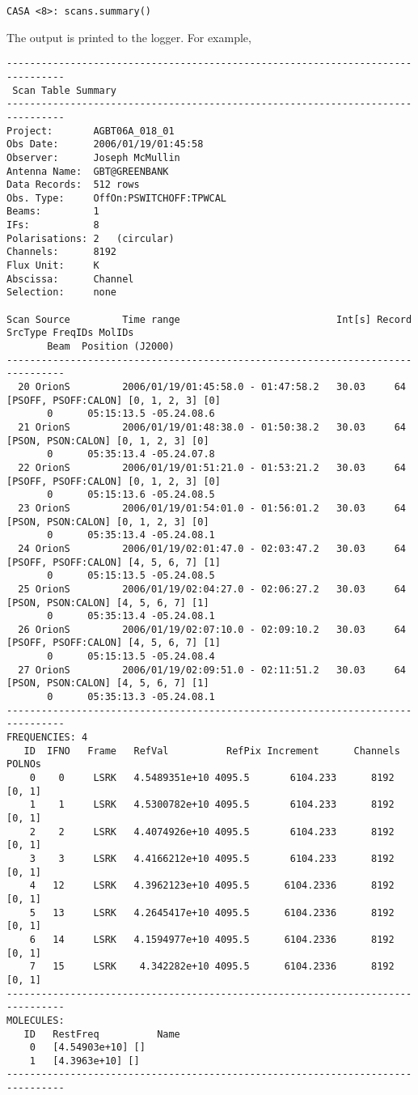 \begin{verbatim}
CASA <8>: scans.summary()
\end{verbatim}
The output is printed to the logger. For example,
\footnotesize
\begin{verbatim}
--------------------------------------------------------------------------------
 Scan Table Summary
--------------------------------------------------------------------------------
Project:       AGBT06A_018_01
Obs Date:      2006/01/19/01:45:58
Observer:      Joseph McMullin
Antenna Name:  GBT@GREENBANK
Data Records:  512 rows
Obs. Type:     OffOn:PSWITCHOFF:TPWCAL
Beams:         1   
IFs:           8   
Polarisations: 2   (circular)
Channels:      8192
Flux Unit:     K
Abscissa:      Channel
Selection:     none

Scan Source         Time range                           Int[s] Record SrcType FreqIDs MolIDs 
       Beam  Position (J2000)       
--------------------------------------------------------------------------------
  20 OrionS         2006/01/19/01:45:58.0 - 01:47:58.2   30.03     64  [PSOFF, PSOFF:CALON] [0, 1, 2, 3] [0]
       0      05:15:13.5 -05.24.08.6
  21 OrionS         2006/01/19/01:48:38.0 - 01:50:38.2   30.03     64  [PSON, PSON:CALON] [0, 1, 2, 3] [0]
       0      05:35:13.4 -05.24.07.8
  22 OrionS         2006/01/19/01:51:21.0 - 01:53:21.2   30.03     64  [PSOFF, PSOFF:CALON] [0, 1, 2, 3] [0]
       0      05:15:13.6 -05.24.08.5
  23 OrionS         2006/01/19/01:54:01.0 - 01:56:01.2   30.03     64  [PSON, PSON:CALON] [0, 1, 2, 3] [0]
       0      05:35:13.4 -05.24.08.1
  24 OrionS         2006/01/19/02:01:47.0 - 02:03:47.2   30.03     64  [PSOFF, PSOFF:CALON] [4, 5, 6, 7] [1]
       0      05:15:13.5 -05.24.08.5
  25 OrionS         2006/01/19/02:04:27.0 - 02:06:27.2   30.03     64  [PSON, PSON:CALON] [4, 5, 6, 7] [1]
       0      05:35:13.4 -05.24.08.1
  26 OrionS         2006/01/19/02:07:10.0 - 02:09:10.2   30.03     64  [PSOFF, PSOFF:CALON] [4, 5, 6, 7] [1]
       0      05:15:13.5 -05.24.08.4
  27 OrionS         2006/01/19/02:09:51.0 - 02:11:51.2   30.03     64  [PSON, PSON:CALON] [4, 5, 6, 7] [1]
       0      05:35:13.3 -05.24.08.1
--------------------------------------------------------------------------------
FREQUENCIES: 4
   ID  IFNO   Frame   RefVal          RefPix Increment      Channels POLNOs
    0    0     LSRK   4.5489351e+10 4095.5       6104.233      8192  [0, 1]
    1    1     LSRK   4.5300782e+10 4095.5       6104.233      8192  [0, 1]
    2    2     LSRK   4.4074926e+10 4095.5       6104.233      8192  [0, 1]
    3    3     LSRK   4.4166212e+10 4095.5       6104.233      8192  [0, 1]
    4   12     LSRK   4.3962123e+10 4095.5      6104.2336      8192  [0, 1]
    5   13     LSRK   4.2645417e+10 4095.5      6104.2336      8192  [0, 1]
    6   14     LSRK   4.1594977e+10 4095.5      6104.2336      8192  [0, 1]
    7   15     LSRK    4.342282e+10 4095.5      6104.2336      8192  [0, 1]
--------------------------------------------------------------------------------
MOLECULES: 
   ID   RestFreq          Name           
    0   [4.54903e+10] []
    1   [4.3963e+10] []
--------------------------------------------------------------------------------
\end{verbatim}
\normalsize

